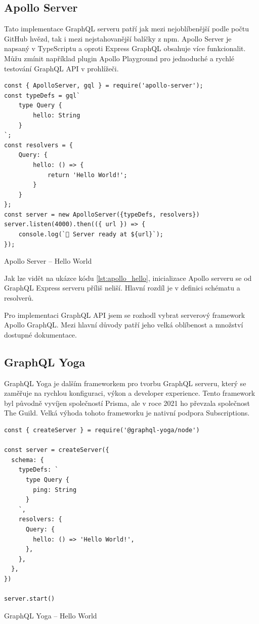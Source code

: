 \documentclass[thesis=M,czech]{FITthesis}[2019/12/23]
\begin{document}
\subsection*{Apollo Server}
Tato implementace GraphQL serveru patří jak mezi nejoblíbenější podle počtu GitHub hvězd, tak i mezi nejstahovanější balíčky z npm. Apollo Server je napsaný v TypeScriptu a oproti Express GraphQL obsahuje více funkcionalit. Můžu zmínit například plugin Apollo Playground pro jednoduché a rychlé testování GraphQL API v prohlížeči.

\begin{listing}[H]
\begin{verbatim}
const { ApolloServer, gql } = require('apollo-server');
const typeDefs = gql`
    type Query {
        hello: String
    }
`;
const resolvers = {
    Query: {
        hello: () => {
            return 'Hello World!';
        }
    }
};
const server = new ApolloServer({typeDefs, resolvers})
server.listen(4000).then(({ url }) => {
    console.log(`🚀 Server ready at ${url}`);
});
\end{verbatim}
\caption{Apollo Server -- Hello World}
\label{lst:apollo_hello}
\end{listing}

Jak lze vidět na ukázce kódu \ref{lst:apollo_hello}, inicializace Apollo serveru se od GraphQL Express serveru příliš neliší. Hlavní rozdíl je v definici schématu a resolverů.

Pro implementaci GraphQL API jsem se rozhodl vybrat serverový framework Apollo GraphQL. Mezi hlavní důvody patří jeho velká oblíbenost a množství dostupné dokumentace.

\subsection{GraphQL Yoga}
GraphQL Yoga je dalším frameworkem pro tvorbu GraphQL serveru, který se zaměřuje na rychlou konfiguraci, výkon a developer experience. Tento framework byl původně vyvíjen společností Prisma, ale v roce 2021 ho převzala společnost The Guild. Velká výhoda tohoto frameworku je nativní podpora Subscriptions.
\begin{listing}[H]
\begin{verbatim}
const { createServer } = require('@graphql-yoga/node')

const server = createServer({
  schema: {
    typeDefs: `
      type Query {
        ping: String
      }
    `,
    resolvers: {
      Query: {
        hello: () => 'Hello World!',
      },
    },
  },
})

server.start()
\end{verbatim}
\caption{GraphQL Yoga -- Hello World}
\label{lst:yoga_hello}
\end{listing}
\end{document}
